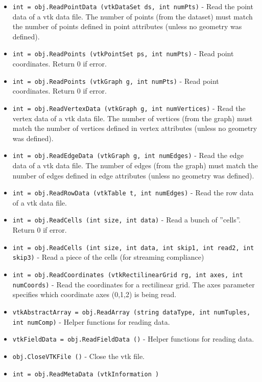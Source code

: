 \begin{itemize}
\item  \verb|int = obj.ReadPointData (vtkDataSet ds, int numPts)| -  Read the point data of a vtk data file. The number of points (from the
 dataset) must match the number of points defined in point attributes
 (unless no geometry was defined).

\item  \verb|int = obj.ReadPoints (vtkPointSet ps, int numPts)| -  Read point coordinates. Return 0 if error.

\item  \verb|int = obj.ReadPoints (vtkGraph g, int numPts)| -  Read point coordinates. Return 0 if error.

\item  \verb|int = obj.ReadVertexData (vtkGraph g, int numVertices)| -  Read the vertex data of a vtk data file. The number of vertices (from the
 graph) must match the number of vertices defined in vertex attributes
 (unless no geometry was defined).

\item  \verb|int = obj.ReadEdgeData (vtkGraph g, int numEdges)| -  Read the edge data of a vtk data file. The number of edges (from the
 graph) must match the number of edges defined in edge attributes
 (unless no geometry was defined).

\item  \verb|int = obj.ReadRowData (vtkTable t, int numEdges)| -  Read the row data of a vtk data file.

\item  \verb|int = obj.ReadCells (int size, int data)| -  Read a bunch of ''cells''. Return 0 if error.

\item  \verb|int = obj.ReadCells (int size, int data, int skip1, int read2, int skip3)| -  Read a piece of the cells (for streaming compliance)

\item  \verb|int = obj.ReadCoordinates (vtkRectilinearGrid rg, int axes, int numCoords)| -  Read the coordinates for a rectilinear grid. The axes parameter specifies
 which coordinate axes (0,1,2) is being read.

\item  \verb|vtkAbstractArray = obj.ReadArray (string dataType, int numTuples, int numComp)| -  Helper functions for reading data.

\item  \verb|vtkFieldData = obj.ReadFieldData ()| -  Helper functions for reading data.

\item  \verb|obj.CloseVTKFile ()| -  Close the vtk file.

\item  \verb|int = obj.ReadMetaData (vtkInformation )|

\end{itemize}
